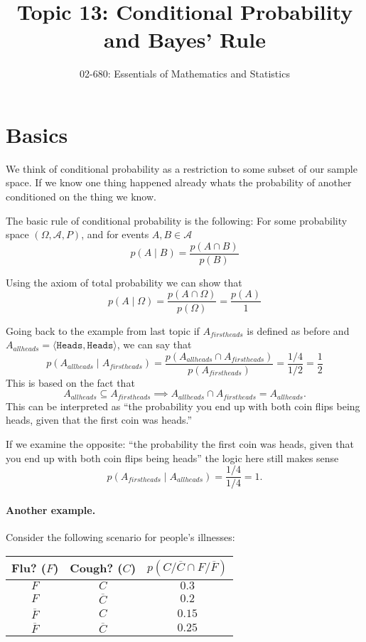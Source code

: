 

\title{Topic 13: Conditional Probability and Bayes' Rule}
\author{02-680: Essentials of Mathematics and Statistics}


\maketitle

\section{Basics}
We think of conditional probability as a restriction to some subset of our sample space. 
If we know one thing happened already whats the probability of another conditioned on the thing we know. 

The basic rule of conditional probability is the following:
For some probability space $(\Omega, \mathcal{A}, P)$, and for events $A,B\in\mathcal{A}$
\[p(A\mid B) = \frac{p(A\cap B)}{p(B)}\]

Using the axiom of total probability we can show that 
\[p(A \mid \Omega) = \frac{p(A \cap \Omega)}{p(\Omega)} = \frac{p(A)}{1}\]

Going back to the example from last topic if $A_{firstheads}$ is defined as before and $A_{allheads}=\langle\texttt{Heads},\texttt{Heads}\rangle$,
we can say that 
\[p(A_{allheads} \mid A_{firstheads}) = \frac{p(A_{allheads} \cap A_{firstheads})}{p(A_{firstheads})} = \frac{1/4}{1/2} = \frac{1}{2}\]
This is based on the fact that \[A_{allheads} \subseteq A_{firstheads} \implies A_{allheads} \cap A_{firstheads} = A_{allheads}.\]
This can be interpreted as ``the probability you end up with both coin flips being heads, given that the first coin was heads.'' 

If we examine the opposite: 
``the probability the first coin was heads, given that you end up with both coin flips being heads'' 
the logic here still makes sense
\[p(A_{firstheads}\mid A_{allheads} ) = \frac{1/4}{1/4} = 1.\]

\paragraph{Another example.}
Consider the following scenario for people's illnesses:
\begin{center}
\begin{tabular}{c|c|c}
\textbf{Flu? ($F$)} & \textbf{Cough? ($C$)} & \textbf{$p(C/\overline{C} \cap F/\overline{F})$}\\
\hline
$F$ & $C$ & $0.3$\\
$F$ & $\overline{C}$ & $0.2$\\
$\overline{F}$ & $C$ & $0.15$\\
$\overline{F}$ & $\overline{C}$ & $0.25$\\
\end{tabular}
\end{center}

